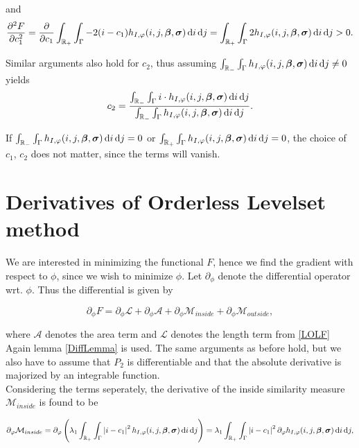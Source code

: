 and 
\begin{equation}
  \frac{\partial^2 F}{\partial c_1^2} = \frac{\partial}{\partial c_1}\int_{\mathbb R_+}\int_{\Gamma}-2(i-c_1) h_{I,\varphi}(i,j,\boldsymbol{\beta} ,\boldsymbol{\sigma} ) \,{\rm d} i\,{\rm d} j = \int_{\mathbb R_+}\int_{\Gamma}2 h_{I,\varphi}(i,j,\boldsymbol{\beta} ,\boldsymbol{\sigma} ) \,{\rm d} i\,{\rm d} j>0.
\end{equation}

Similar arguments also hold for $c_2$, thus assuming $\int_{\mathbb R_-}\int_{\Gamma}h_{I,\varphi}(i,j,\boldsymbol{\beta} ,\boldsymbol{\sigma} ) \,{\rm d} i\,{\rm d} j\neq 0$ yields
\begin{equation}
  c_2 = \frac{\int_{\mathbb R_-}\int_{\Gamma} i\cdot h_{I,\varphi}(i,j,\boldsymbol{\beta} ,\boldsymbol{\sigma} ) \,{\rm d} i\,{\rm d} j}{\int_{\mathbb R_-}\int_{\Gamma}h_{I,\varphi}(i,j,\boldsymbol{\beta} ,\boldsymbol{\sigma} ) \,{\rm d} i\,{\rm d} j}.
\end{equation}

If $\int_{\mathbb R_-}\int_{\Gamma}h_{I,\varphi}(i,j,\boldsymbol{\beta} ,\boldsymbol{\sigma} ) \,{\rm d} i\,{\rm d} j=0$ or $\int_{\mathbb R_+}\int_{\Gamma}h_{I,\varphi}(i,j,\boldsymbol{\beta} ,\boldsymbol{\sigma} ) \,{\rm d} i\,{\rm d} j = 0$, the choice of $c_1$, $c_2$ does not matter, since the terms will vanish.


\section{Derivatives of Orderless Levelset method}\label{section:OLder}
We are interested in minimizing the functional $F$, hence we find the gradient with respect to $\phi$, since we wish to minimize $\phi$. Let $\partial_\phi$ denote the differential operator wrt. $\phi$. Thus the differential is given by

\begin{equation}
  \partial_\phi F = \partial_\phi \mathcal{L} + \partial_\phi \mathcal{A} + \partial_\phi\mathcal{M}_{inside} + \partial_\phi \mathcal{M}_{outside},
\end{equation}

where $\mathcal{A}$ denotes the area term and $\mathcal{L}$ denotes the length term from \eqref{LOLF}\\

Again lemma \ref{DiffLemma} is used. The same arguments as before hold, but we also have to assume that $P_2$ is differentiable and that the absolute derivative is majorized by an integrable function.\\
Considering the terms seperately, the derivative of the inside similarity measure $\mathcal{M}_{inside}$ is found to be

\begin{equation}
  \partial_\varphi \mathcal{M}_{inside} = \partial_\varphi \left( \lambda_1\int_{\mathbb R_+} \int_{\Gamma} \left| {i-c_1} \right|^2h_{I,\varphi}(i,j,\boldsymbol{\beta} ,\boldsymbol{\sigma} )\,{\rm d} i\,{\rm d} j\right) = \lambda_1\int_{\mathbb R_+} \int_{\Gamma} \left| {i-c_1} \right|^2 \partial_\varphi h_{I,\varphi}(i,j,\boldsymbol{\beta} ,\boldsymbol{\sigma} )\,{\rm d} i\,{\rm d} j,
\end{equation}

